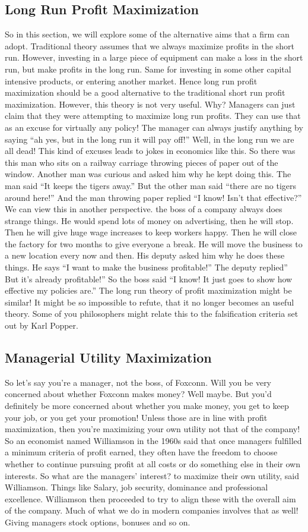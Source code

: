 \documentclass[DIV=classic,11pt,numbers=noenddot,listof=totoc,bibliography=totoc,parskip]{scrartcl}
\begin{document}
\subsection{Long Run Profit Maximization}
 So in this section, we will explore some of the alternative aims that a firm can adopt. Traditional theory assumes that we always maximize profits in the short run. However, investing in a large piece of equipment can make a loss in the short run, but make profits in the long run. Same for investing in some other capital intensive products, or entering another market. Hence long run profit maximization should be a good alternative to the traditional short run profit maximization. However, this theory is not very useful. Why? Managers can just claim that they were attempting to maximize long run profits. They can use that as an excuse for virtually any policy! The manager can always justify anything by saying “ah yes, but in the long run it will pay off!” Well, in the long run we are all dead! This kind of excuses leads to jokes in economics like this. So there was this man who sits on a railway carriage throwing pieces of paper out of the window. Another man was curious and asked him why he kept doing this. The man said “It keeps the tigers away.” But the other man said “there are no tigers around here!” And the man throwing paper replied “I know! Isn’t that effective?” We can view this in another perspective. the boss of a company always does strange things. He would spend lots of money on advertising, then he will stop. Then he will give huge wage increases to keep workers happy. Then he will close the factory for two months to give everyone a break. He will move the business to a new location every now and then. His deputy asked him why he does these things. He says “I want to make the business profitable!” The deputy replied” But it’s already profitable!” So the boss said “I know! It just goes to show how effective my policies are.” The long run theory of profit maximization might be similar! It might be so impossible to refute, that it no longer becomes an useful theory. Some of you philosophers might relate this to the falsification criteria set out by Karl Popper. 
\subsection{Managerial Utility Maximization}
 So let’s say you’re a manager, not the boss, of Foxconn. Will you be very concerned about whether Foxconn makes money? Well maybe. But you’d definitely be more concerned about whether you make money, you get to keep your job, or you get your promotion! Unless those are in line with profit maximization, then you’re maximizing your own utility not that of the company! So an economist named Williamson in the 1960s said that once managers fulfilled a minimum criteria of profit earned, they often have the freedom to choose whether to continue pursuing profit at all costs or do something else in their own interests. So what are the managers’ interest? to maximize their own utility, said Williamson. Things like Salary, job security, dominance and professional excellence. Williamson then proceeded to try to align these with the overall aim of the company. Much of what we do in modern companies involves that as well! Giving managers stock options, bonuses and so on. 
\end{document}
